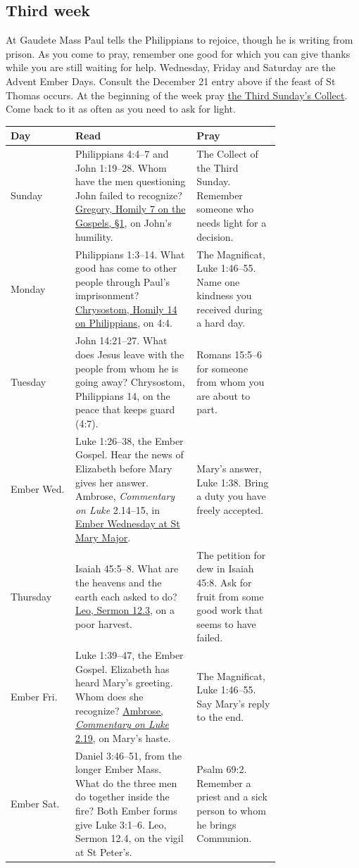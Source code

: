 \subsection{Third week}

At Gaudete Mass Paul tells the Philippians to rejoice, though he is
writing from prison. As you come to pray, remember one good for which
you can give thanks while you are still waiting for help. Wednesday,
Friday and Saturday are the Advent Ember Days. Consult the December 21
entry above if the feast of St Thomas occurs. At the beginning of the
week pray \hyperref[sec:advent-gaudete-collect]{the Third Sunday's Collect}. Come back to it as often as you need to ask
for light.

\begin{longtable}{@{}lp{0.45\linewidth}p{0.31\linewidth}@{}}
\textbf{Day} & \textbf{Read} & \textbf{Pray} \\
\hline
\endhead
Sunday & Philippians 4:4--7 and John 1:19--28. Whom have the men questioning John failed to recognize? \href{https://archive.org/details/romanbreviaryref01cathuoft/page/241/mode/1up}{Gregory, Homily 7 on the Gospels, §1}, on John's humility. & The Collect of the Third Sunday. Remember someone who needs light for a decision. \\
Monday & Philippians 1:3--14. What good has come to other people through Paul's imprisonment? \href{https://www.newadvent.org/fathers/230214.htm}{Chrysostom, Homily 14 on Philippians}, on 4:4. & The Magnificat, Luke 1:46--55. Name one kindness you received during a hard day. \\
Tuesday & John 14:21--27. What does Jesus leave with the people from whom he is going away? Chrysostom, Philippians 14, on the peace that keeps guard (4:7). & Romans 15:5--6 for someone from whom you are about to part. \\
Ember Wed. & Luke 1:26--38, the Ember Gospel. Hear the news of Elizabeth before Mary gives her answer. Ambrose, \emph{Commentary on Luke} 2.14--15, in \hyperref[sec:advent-ember-wednesday]{Ember Wednesday at St Mary Major}. & Mary's answer, Luke 1:38. Bring a duty you have freely accepted. \\
Thursday & Isaiah 45:5--8. What are the heavens and the earth each asked to do? \href{https://www.newadvent.org/fathers/360312.htm}{Leo, Sermon 12.3}, on a poor harvest. & The petition for dew in Isaiah 45:8. Ask for fruit from some good work that seems to have failed. \\
Ember Fri. & Luke 1:39--47, the Ember Gospel. Elizabeth has heard Mary's greeting. Whom does she recognize? \href{https://archive.org/details/romanbreviaryref01cathuoft/page/252/mode/1up}{Ambrose, \emph{Commentary on Luke} 2.19}, on Mary's haste. & The Magnificat, Luke 1:46--55. Say Mary's reply to the end. \\
Ember Sat. & Daniel 3:46--51, from the longer Ember Mass. What do the three men do together inside the fire? Both Ember forms give Luke 3:1--6. Leo, Sermon 12.4, on the vigil at St Peter's. & Psalm 69:2. Remember a priest and a sick person to whom he brings Communion. \\
\end{longtable}

